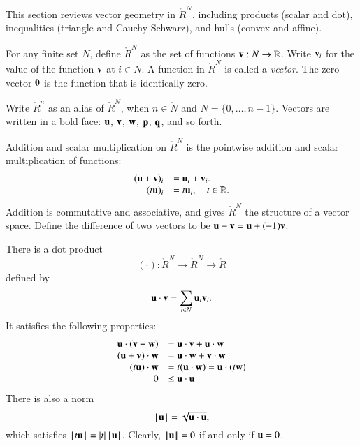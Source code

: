 This section reviews vector geometry in $\ring{R}^N$, including products (scalar and dot), inequalities (triangle and Cauchy-Schwarz), and hulls (convex and affine).

\begin{definition}
For any finite set $N$, define $\ring{R}^N$ as the set of functions
${\mathbf v}:N\to\mathbb{R}$. Write ${\mathbf v}_i$ for the value of the function ${\mathbf v}$ at $i\in N$.
%
%
A function in $\ring{R}^N$ is called a {\it vector}.  
The zero vector ${\mathbf 0}$ is the function that is identically zero.  
%
\end{definition}
Write $\ring{R}^n$ as an alias of $\ring{R}^N$, 
when $n\in\ring{N}$ and $N=\{0,\ldots,n-1\}$.  Vectors are written in a bold face:
${\mathbf u}$, ${\mathbf v}$, ${\mathbf w}$, ${\mathbf p}$, ${\mathbf q}$, and so forth.

Addition and scalar multiplication on $\ring{R}^N$
is the pointwise addition and scalar multiplication of functions:
    $$\begin{array}{rll}
    ({\mathbf u} + {\mathbf v})_i &= {\mathbf u}_i + {\mathbf v}_i.\\
    (t {\mathbf u})_i &= t {\mathbf u}_i,\quad t\in\mathbb{R}.\\
    \end{array}
    $$
%
%
Addition is commutative and associative, and gives
$\ring{R}^N$ the structure of a vector space.
Define the difference of two vectors to be ${\mathbf u} - {\mathbf v} = {\mathbf u} + (-1) {\mathbf v}$.
%

There is a dot product
$$(\cdot):\ring{R}^N\to\ring{R}^N\to\ring{R}$$ defined by
    $${\mathbf u}\cdot {\mathbf v} = \sum_{i\in N} {\mathbf u}_i {\mathbf v}_i.$$
%
%
It satisfies the following
properties:
    $$\begin{array}{rll}
        {\mathbf u} \cdot ({\mathbf v} + {\mathbf w}) &= {\mathbf u} \cdot {\mathbf v} + {\mathbf u} \cdot {\mathbf w}\\
        ({\mathbf u} + {\mathbf v})\cdot {\mathbf w} &= {\mathbf u} \cdot {\mathbf w} + {\mathbf v} \cdot {\mathbf w}\\
        (t {\mathbf u})\cdot {\mathbf w} &= t({\mathbf u} \cdot {\mathbf w}) = {\mathbf u} \cdot (t {\mathbf w})\\
        0 &\le {\mathbf u}\cdot {\mathbf u}\\
    \end{array}$$
There is also a norm
$${{\hskip0.1em|\hskip-0.15em|\hskip0.1em}{\mathbf u}{\hskip0.1em|\hskip-0.15em|\hskip0.1em}} = \sqrt{{\mathbf u}\cdot {\mathbf u}},$$
which satisfies ${{\hskip0.1em|\hskip-0.15em|\hskip0.1em} t {\mathbf u} {\hskip0.1em|\hskip-0.15em|\hskip0.1em}} = |t| \, {{\hskip0.1em|\hskip-0.15em|\hskip0.1em}{\mathbf u}{\hskip0.1em|\hskip-0.15em|\hskip0.1em}}$.  Clearly, ${{\hskip0.1em|\hskip-0.15em|\hskip0.1em}{\mathbf u}{\hskip0.1em|\hskip-0.15em|\hskip0.1em}}=0$  if and only if ${\mathbf u}=0$.
%

